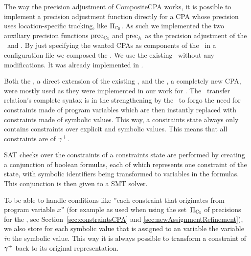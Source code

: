 The way the precision adjustment of CompositeCPA works, it is possible to implement a precision adjustment function directly for a CPA whose precision uses location-specific tracking, like $\Pi_{\mathbb{C_{S}}}$.
As such we implemented the two auxiliary precision functions $\operatorname{\text{prec}}_{\mathbb{C_{S}}}$ and $\operatorname{\text{prec}}_{\mathbb{A}}$ as the precision adjustment of the \symbolicValueAnalysisCPA\ and \constraintsCPA.
By just specifying the wanted CPAs as components of the \compositeCPA\ in a configuration file we composed the \symbolicExecutionCPA.
We use the existing \locationCPA\ without any modifications. It was already implemented in \cpaChecker.

Both the \symbolicValueAnalysisCPA, a direct extension of the existing ,
and the \constraintsCPA, a completely new CPA, were mostly used as they were implemented in our work for \cite{Lemberger2015}.
The \constraintsCPA\ transfer relation's complete syntax is in the strengthening by the \symbolicValueAnalysisCPA\ to forgo the need for constraints made of program variables which are then instantly replaced with constraints made of symbolic values.
This way, a constraints state always only contains constraints over explicit and symbolic values. This means that all constraints are of ${\gamma^+}$.

SAT checks over the constraints of a constraints state are performed by creating a conjunction of boolean formulas, each of which represents one constraint of the state, with symbolic identifiers being transformed to variables in the formulas. This conjunction is then given to a SMT solver.

To be able to handle conditions like ''each constraint that originates from program variable $x$''
(for example as used when using the set~$\Pi_{\mathbb{C_{S}}}$ of precisions for the \constraintsCPA,
see Section~\ref{sec:constraintsCPA} and \ref{sec:newAssignmentRefinement}),
we also store for each symbolic value that is assigned to an variable the variable \emph{in} the symbolic value.
This way it is always possible to transform a constraint of ${\gamma^+}$ back to its original representation.
